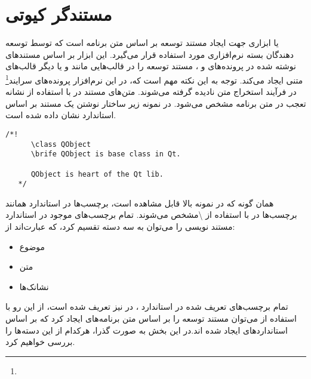 \section{مستندگر کیوتی}

 یا  ابزاری جهت ایجاد مستند توسعه بر اساس متن برنامه است که توسط توسعه دهندگان
بسته نرم‌افزاری  مورد استفاده قرار می‌گیرد. این ابزار بر اساس مستند‌های نوشته شده در 
پرونده‌های  و ،  مستند توسعه را در قالب‌هایی مانند  و یا دیگر قالب‌های
متنی ایجاد می‌کند. توجه به این نکته مهم است که، در این نرم‌افزار پرونده‌های سرایند\footnote{}
در فرآیند استخراج متن نادیده گرفته می‌شوند. متن‌های مستند در  با استفاده از نشانه تعجب 
در متن برنامه مشخص می‌شود. در نمونه زیر ساختار نوشتن یک مستند بر اساس استاندارد 
نشان داده شده است.
\begin{latin}
 \lstset{language=C++}  
\begin{lstlisting}[frame=single] 
  /*! 
      \class QObject
      \brife QObject is base class in Qt.
      
      QObject is heart of the Qt lib.
   */
\end{lstlisting}
\end{latin}

همان گونه که در نمونه بالا قابل مشاهده است، برچسب‌ها در استاندارد  همانند 
برچسب‌ها در   با استفاده از \textbackslash مشخص می‌شوند. تمام برچسب‌های
موجود در استاندارد مستند نویسی  را می‌توان به سه دسته تقسیم کرد، که عبارت‌اند از:
\begin{itemize}
 \item موضوع
 \item متن
 \item نشانک‌ها
\end{itemize}
تمام برچسب‌های تعریف شده در استاندارد  ، در  نیز تعریف شده است، از این رو 
با استفاده از  می‌توان مستند توسعه را بر اساس متن برنامه‌های ایجاد کرد که بر اساس
استانداردهای ‌ایجاد شده اند.در این بخش به صورت گذرا، هرکدام از این دسته‌ها را بررسی 
خوا‌هیم کرد.
